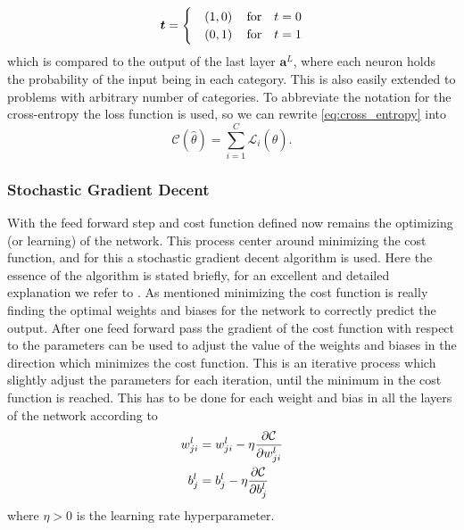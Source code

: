 \documentclass[10pt, twocolumn]{article}
\begin{document}
\begin{equation*}
    \bm{t} =
        \begin{cases}
        &\left(1,0\right) \qfor t = 0
        \\
        &\left(0,1\right) \qfor t=1
        \end{cases}
\end{equation*}
which is compared to the output of the last layer $\bm{a}^L$, where each neuron holds the probability of the input being in each category. This is also easily extended to problems with arbitrary number of categories. To abbreviate the notation for the cross-entropy the loss function is used, so we can rewrite \cref{eq:cross_entropy} into
\begin{equation}
    \mathcal{C}\left(\hat{\theta}\right) = \sum_{i=1}^{C} \mathcal{L}_i\left(\hat{\theta}\right).
    \label{eq:cross_entropy_as_loss_func}
\end{equation}

\subsubsection{Stochastic Gradient Decent}
\label{subsubsec:Theory/NN/Gradient_descent}
With the feed forward step and cost function defined now remains the optimizing (or learning) of the network. This process center around minimizing the cost function, and for this a stochastic gradient decent algorithm is used. Here the essence of the algorithm is stated briefly, for an excellent and detailed explanation we refer to \cite{NN_deePlearning_michael}. As mentioned minimizing the cost function is really finding the optimal weights and biases for the network to correctly predict the output. After one feed forward pass the gradient of the cost function with respect to the parameters can be used to adjust the value of the weights and biases in the direction which minimizes the cost function. This is an iterative process which slightly adjust the parameters for each iteration, until the minimum in the cost function is reached. This has to be done for each weight and bias in all the layers of the network according to
\begin{align}
    w_{ji}^l &= w_{ji}^l - \eta \pdv{\mathcal{C}}{w_{ji}^l}
    \label{eq:update_weights}
    \\
    b_j^l &= b_j^l - \eta \pdv{\mathcal{C}}{b_j^l}
    \label{eq:update_biases}
\end{align}
where $\eta >0$ is the learning rate hyperparameter.
\end{document}
